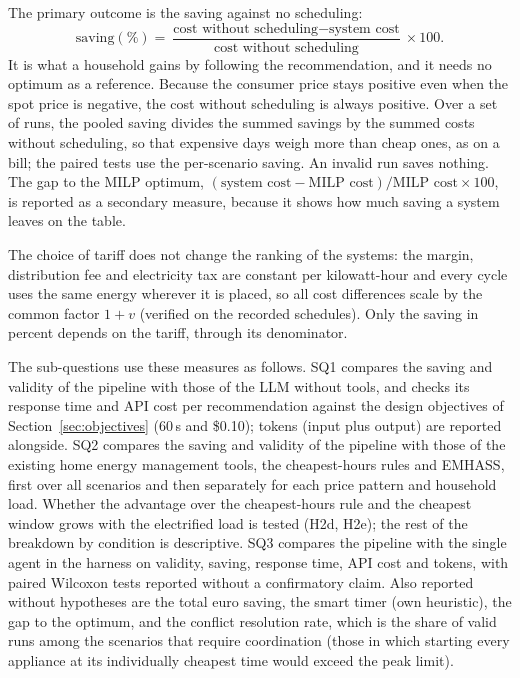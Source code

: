 \documentclass[12pt,a4paper]{report}
\begin{document}
The primary outcome is the saving against no scheduling:
\[
\text{saving} (\%) =
  \frac{\text{cost without scheduling} - \text{system cost}}{\text{cost without scheduling}} \times 100 .
\]
It is what a household gains by following the recommendation, and it
needs no optimum as a reference. Because the consumer price stays
positive even when the spot price is negative, the cost without
scheduling is always positive. Over a set of runs, the pooled saving
divides the summed savings by the summed costs without scheduling, so
that expensive days weigh more than cheap ones, as on a bill; the
paired tests use the per-scenario saving. An invalid run saves nothing.
The gap to the MILP optimum,
$(\text{system cost} - \text{MILP cost}) / \text{MILP cost} \times 100$,
is reported as a secondary measure, because it shows how much saving a
system leaves on the table.

The choice of tariff does not change the ranking of the systems: the
margin, distribution fee and electricity tax are constant per
kilowatt-hour and every cycle uses the same energy wherever it is
placed, so all cost differences scale by the common factor $1 + v$
(verified on the recorded schedules). Only the saving in percent depends
on the tariff, through its denominator.

The sub-questions use these measures as follows. SQ1 compares the saving
and validity of the pipeline with those of the LLM without tools, and
checks its response time and API cost per recommendation against the
design objectives of Section~\ref{sec:objectives} (60\,s and \$0.10);
tokens (input plus output) are reported alongside. SQ2 compares the
saving and validity of the pipeline with those of the existing home
energy management tools, the cheapest-hours rules and EMHASS, first over
all scenarios and then separately for each price pattern and household
load. Whether the advantage over the cheapest-hours rule and the
cheapest window grows with the electrified load is tested (H2d, H2e);
the rest of the breakdown by condition is descriptive. SQ3 compares the
pipeline with the single agent in the harness on validity, saving,
response time, API cost and tokens, with paired Wilcoxon tests reported
without a confirmatory claim. Also reported without hypotheses are the
total euro saving, the smart timer (own heuristic), the gap to the
optimum, and the conflict resolution rate,
which is the share of valid runs among the scenarios that require
coordination (those in which starting every appliance at its
individually cheapest time would exceed the peak limit).
\end{document}
